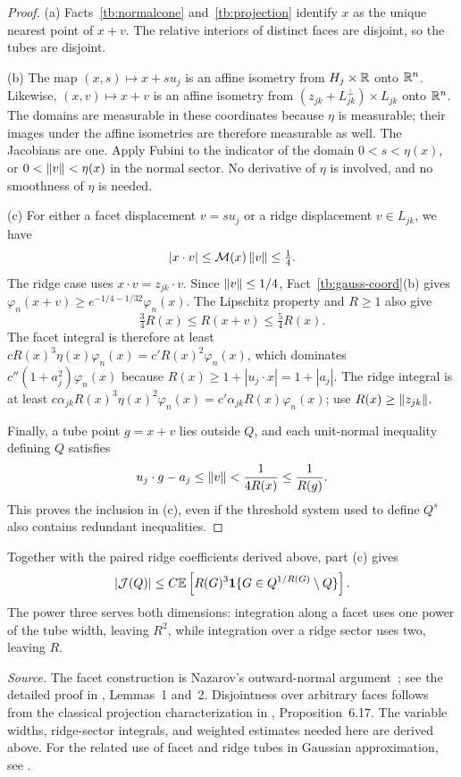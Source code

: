 \documentclass[11pt,letterpaper]{article}
\theoremstyle{plain}
\begin{document}
\begin{proof}
(a) Facts~\ref{tb:normalcone} and~\ref{tb:projection} identify \(x\)
as the unique nearest point of \(x+v\). The relative interiors of
distinct faces are disjoint, so the tubes are disjoint.

(b) The map \((x,s)\mapsto x+s u_j\) is an affine isometry from
\(H_j\times\mathbb R\) onto \(\mathbb R^n\). Likewise, \((x,v)\mapsto x+v\)
is an affine isometry from \((z_{jk}+L_{jk}^\perp)\times L_{jk}\)
onto \(\mathbb R^n\). The domains are measurable in these coordinates because \(\eta\)
is measurable; their images under the affine isometries are therefore
measurable as well. The Jacobians are one. Apply Fubini to the indicator
of the domain \(0<s<\eta(x)\), or \(0<\left\lVert v\right\rVert<\eta(x)\) in the
normal sector. No derivative of \(\eta\) is involved, and no
smoothness of \(\eta\) is needed.

(c) For either a facet displacement \(v=s u_j\) or a ridge displacement
\(v\in L_{jk}\), we have
\[
 |x\cdot v|\le\mathcal M(x)\left\lVert v\right\rVert\le\tfrac14.
\]
The ridge case uses \(x\cdot v=z_{jk}\cdot v\). Since
\(\left\lVert v\right\rVert\le1/4\), Fact~\ref{tb:gauss-coord}(b) gives
\(\varphi_n(x+v)\ge e^{-1/4-1/32}\varphi_n(x)\).
The Lipschitz property and \(R\ge1\) also give
\[
 \tfrac34R(x)\le R(x+v)\le\tfrac54R(x).
\]
The facet integral is therefore at least
\(cR(x)^3\eta(x)\varphi_n(x)=c'R(x)^2\varphi_n(x)\), which
dominates \(c''(1+a_j^2)\varphi_n(x)\) because
\(R(x)\ge1+|u_j\cdot x|=1+|a_j|\). The ridge integral is at least
\(c\alpha_{jk}R(x)^3\eta(x)^2\varphi_n(x)
=c'\alpha_{jk}R(x)\varphi_n(x)\); use
\(R(x)\ge\left\lVert z_{jk}\right\rVert\).

Finally, a tube point \(g=x+v\) lies outside \(Q\), and each
unit-normal inequality defining \(Q\) satisfies
\[
 u_j\cdot g-a_j\le\left\lVert v\right\rVert<\frac1{4R(x)}\le\frac1{R(g)}.
\]
This proves the inclusion in (c), even if the threshold system used
to define \(Q^s\) also contains redundant inequalities.
\end{proof}

Together with the paired ridge coefficients derived above, part (c)
gives
\[
 |\mathcal J(Q)|\le C\mathbb E\left[R(G)^3
              \mathbf 1\{G\in Q^{1/R(G)}\setminus Q\}\right].
\]
The power three serves both dimensions: integration along a facet
uses one power of the tube width, leaving \(R^2\), while integration
over a ridge sector uses two, leaving \(R\).

\emph{Source.} The facet construction is Nazarov's outward-normal
argument~; see the detailed proof in ,
Lemmas~1 and~2. Disjointness over arbitrary faces follows from the
classical projection characterization in , Proposition~6.17.
The variable widths, ridge-sector integrals, and weighted estimates
needed here are derived above. For the related use of facet and ridge
tubes in Gaussian approximation, see .
\end{document}
